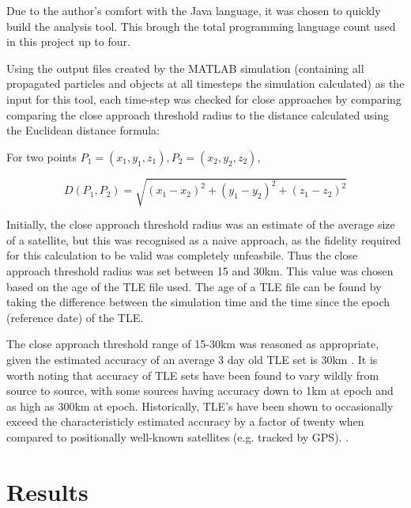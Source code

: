 \documentclass[12pt,openany,a4paper]{book}
\begin{document}
		Due to the author's comfort with the Java language, it was chosen to quickly build the analysis tool. This brough the total programming language count used in this project up to four. \newline
		
		Using the output files created by the MATLAB simulation (containing all propagated particles and objects at all timesteps the simulation calculated) as the input for this tool, each time-step was checked for close approaches by comparing comparing the close approach threshold radius to the distance calculated using the Euclidean distance formula: \newline

		For two points $P_1 = (x_1, y_1, z_1), P_2 = (x_2, y_2, z_2)$, \newline
		
		\begin{equation}
			D(P_1, P_2) = \sqrt{(x_1-x_2)^2 + (y_1-y_2)^2 + (z_1-z_2)^2}
		\end{equation} \newline
		
		
		Initially, the close approach threshold radius was an estimate of the average size of a satellite, but this was recognised as a naive approach, as the fidelity required for this calculation to be valid was completely unfeasbile. Thus the close approach threshold radius was set between 15 and 30km. This value was chosen based on the age of the TLE file used. The age of a TLE file can be found by taking the difference between the simulation time and the time since the epoch (reference date) of the TLE. \newline
		
		The close approach threshold range of 15-30km was reasoned as appropriate, given the estimated accuracy of an average 3 day old TLE set is 30km \cite{agiAcc}. It is worth noting that accuracy of TLE sets have been found to vary wildly from source to source, with some sources having accuracy down to 1km at epoch and as high as 300km at epoch. Historically, TLE's have been shown to occasionally exceed the characteristicly estimated accuracy by a factor of twenty when compared to positionally well-known satellites (e.g. tracked by GPS). \cite{agiTLEAcc}. \newline
		

	
	
	\chapter{Results}
	
\end{document}
